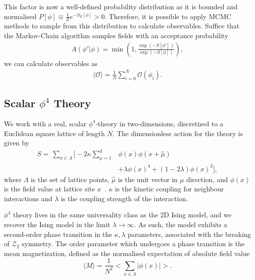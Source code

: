 \documentclass[11pt]{article}
\begin{document}
    This factor is now a well-defined probability distribution as it is bounded and normalised
    $P[\phi] \equiv \frac{1}{Z} e^{-S_E[\phi]} > 0$.
    Therefore, it is possible to apply MCMC methods to sample from this distribution to calculate observables.
    Suffice that the Markov-Chain algorithm samples fields with an acceptance probability
    \begin{equation}\label{eq:accept_prob_lft}
    \begin{aligned}
        A(\phi'|\phi) = \min \left(1, \frac{\exp(-S[\phi'])}{\exp(-S[\phi])} \right),
    \end{aligned}
    \end{equation}
    we can calculate observables as
    \begin{equation}\label{eq:field_observable}
    \begin{aligned}
        \langle \mathcal{O} \rangle = \frac{1}{N}\sum_{i=0}^N \mathcal{O}(\phi_i).
    \end{aligned}
    \end{equation}

\subsection{Scalar $\phi^4$ Theory}\label{subsec:phi^4_theory}
    We work with a real, scalar $\phi^4$-theory in two-dimensions, discretized to a Euclidean square lattice of length $N$.
    The dimensionless action for the theory is given by
    \begin{equation}\label{eq:phi4_action}
    \begin{aligned}
        S = \,\sum\limits_{x \in \Lambda} \Biggl[-2\kappa \sum\limits_{\mu=1}^d & \phi(x) \phi(x+\hat{\mu}) \\
        &+\lambda \phi(x)^4 + (1 - 2\lambda) \phi(x)^2 \Biggr],
    \end{aligned}
    \end{equation}
    where $\Lambda$ is the set of lattice points, $\hat{\mu}$ is the unit vector in $\mu$ direction, and $\phi(x)$ is
    the field value at lattice site $x$~\cite{maas2020lattice}. $\kappa$ is the kinetic coupling for neighbour interactions and $\lambda$ is the
    coupling strength of the interaction.

    $\phi^4$ theory lives in the same universality class as the 2D Ising model, and we recover the Ising model
    in the limit $\lambda \rightarrow \infty$.
    As such, the model exhibits a second-order phase transition in the $\kappa, \lambda$ parameters, associated
    with the breaking of $\mathcal{Z}_2$ symmetry.
    The order parameter which undergoes a phase transition is the mean magnetization, defined as the normalised
    expectation of absolute field value
    \begin{equation}\label{eq:magnetization}
        \langle M \rangle = \frac{1}{N^2} \bigl< \sum_{x \in \Lambda} |\phi(x)| \bigr>.
    \end{equation}
\end{document}
